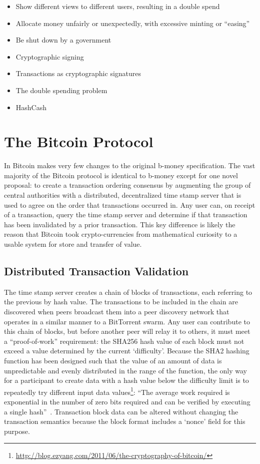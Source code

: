 \begin{itemize} \item Show different views to different users, resulting in a
        double spend \item Allocate money unfairly or unexpectedly, with
        excessive minting or ``easing'' \item Be shut down by a government \item
        Cryptographic signing \item Transactions as cryptographic signatures
        \item The double spending problem \item HashCash \end{itemize}

\section{The Bitcoin Protocol}
In Bitcoin \textcite{satoshi} makes very few changes to the original b-money\cite{b-money} specification.  The vast majority of the Bitcoin protocol is identical to b-money except for one novel proposal: to create a transaction ordering consensus by augmenting the group of central authorities with a
distributed, decentralized time stamp server that is used to agree on the
order that transactions occurred in.  Any user can, on receipt of a transaction,
query the time stamp server and determine if that transaction has been
invalidated by a prior transaction. This key difference is likely the reason that Bitcoin took crypto-currencies from mathematical curiosity to a usable system for store and transfer of value.

\subsection{Distributed Transaction Validation}
The time stamp server creates a chain of blocks of transactions, each referring
to the previous by hash value.  The transactions to be included in the chain are
discovered when peers broadcast them into a peer discovery network that operates
in a similar manner to a BitTorrent swarm.  Any user can contribute to this
chain of blocks, but before another peer will relay it to others, it must meet a
``proof-of-work'' requirement: the SHA256 hash value of each block must not
exceed a value determined by the current `difficulty'.  Because the SHA2 hashing
function has been designed such that the value of an amount of data is
unpredictable and evenly distributed in the range of the function, the only way
for a participant to create data with a hash value below the difficulty limit is
to repeatedly try different input data
values\footnote{\url{http://blog.ezyang.com/2011/06/the-cryptography-of-bitcoin/}}: ``The average work required is exponential in the number
of zero bits required and can be verified by executing a single hash''~\cite{satoshi}.
Transaction block data can be altered without changing the transaction semantics
because the block format includes a `nonce' field for this purpose.

